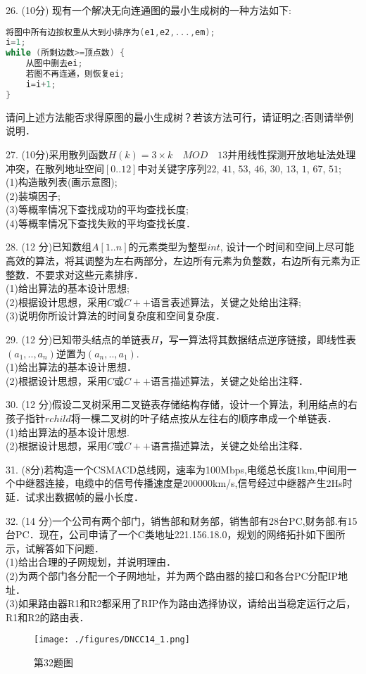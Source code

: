 26. (10分) 现有一个解决无向连通图的最小生成树的一种方法如下: \\
\begin{lstlisting}[language=cpp]
将图中所有边按权重从大到小排序为(e1,e2,...,em);
i=1;
while (所剩边数>=顶点数) {
    从图中删去ei;
    若图不再连通，则恢复ei;
    i=i+1;
}
\end{lstlisting}
请问上述方法能否求得原图的最小生成树？若该方法可行，请证明之;否则请举例说明．

27. (10分)采用散列函数$H(k)=3\times k \quad MOD \quad 13$并用线性探测开放地址法处理冲突，在散列地址空间$[0..12]$中对关键字序列$22$, $41$, $53$, $46$, $30$, $13$, $1$, $67$, $51$; \\
(1)构造散列表(画示意图); \\
(2)装填因子; \\
(3)等概率情况下查找成功的平均查找长度; \\
(4)等概率情况下查找失败的平均查找长度．

28. (12 分)已知数组$A[1..n]$的元素类型为整型$int$, 设计一个时间和空间上尽可能高效的算法，将其调整为左右两部分，左边所有元素为负整数，右边所有元素为正整数．不要求对这些元素排序． \\
(1)给出算法的基本设计思想; \\
(2)根据设计思想，采用$C$或$C++$语言表述算法，关键之处给出注释; \\
(3)说明你所设计算法的时间复杂度和空间复杂度．

29. (12 分)已知带头结点的单链表$H$，写一算法将其数据结点逆序链接，即线性表$(a_1,..,a_n)$逆置为$(a_n,..,a_1)$. \\
(1)给出算法的基本设计思想． \\
(2)根据设计思想，采用$C$或$C++$语言描述算法，关键之处给出注释．

30. (12 分)假设二叉树采用二叉链表存储结构存储，设计一个算法，利用结点的右孩子指针$rchild$将一棵二叉树的叶子结点按从左往右的顺序串成一个单链表． \\
(1)给出算法的基本设计思想. \\
(2)根据设计思想，采用$C$或$C++$语言描述算法，关键之处给出注释．

31. (8分)若构造一个CSMACD总线网，速率为100Mbps,电缆总长度1km,中间用一个中继器连接，电缆中的信号传播速度是200000km/s,信号经过中继器产生2Hs时延．试求出数据帧的最小长度．

32. (14 分)一个公司有两个部门，销售部和财务部，销售部有28台PC,财务部.有15台PC．现在，公司申请了一个C类地址221.156.18.0，规划的网络拓扑如下图所示，试解答如下问题． \\
(1)给出合理的子网规划，并说明理由． \\
(2)为两个部门各分配一个子网地址，并为两个路由器的接口和各台PC分配IP地址． \\
(3)如果路由器R1和R2都采用了RIP作为路由选择协议，请给出当稳定运行之后，R1和R2的路由表．
\begin{figure}[ht]
\centering
\texttt{[image: ./figures/DNCC14\_1.png]}
\caption{第32题图} \label{DNCC14_fig1}
\end{figure}

